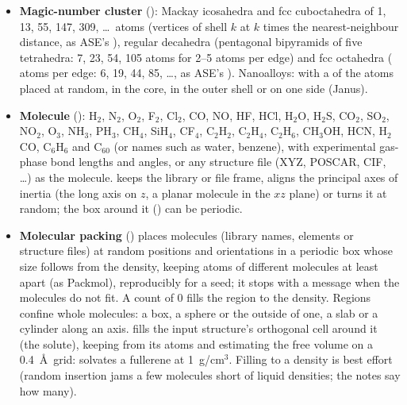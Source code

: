 \begin{itemize}
\item \textbf{Magic-number cluster} (): Mackay icosahedra and fcc cuboctahedra of 1, 13, 55, 147, 309, \ldots\ atoms (vertices of shell $k$ at $k$ times the nearest-neighbour distance, as ASE's ), regular decahedra (pentagonal bipyramids of five tetrahedra: 7, 23, 54, 105 atoms for 2--5 atoms per edge) and fcc octahedra ( atoms per edge: 6, 19, 44, 85, \ldots, as ASE's ). Nanoalloys:  with a  of the atoms placed at random, in the core, in the outer shell or on one side (Janus).
\item \textbf{Molecule} (): H$_2$, N$_2$, O$_2$, F$_2$, Cl$_2$, CO, NO, HF, HCl, H$_2$O, H$_2$S, CO$_2$, SO$_2$, NO$_2$, O$_3$, NH$_3$, PH$_3$, CH$_4$, SiH$_4$, CF$_4$, C$_2$H$_2$, C$_2$H$_4$, C$_2$H$_6$, CH$_3$OH, HCN, H$_2$CO, C$_6$H$_6$ and C$_{60}$ (or names such as water, benzene), with experimental gas-phase bond lengths and angles, or any structure file (XYZ, POSCAR, CIF, \ldots) as the molecule.  keeps the library or file frame, aligns the principal axes of inertia (the long axis on $z$, a planar molecule in the $xz$ plane) or turns it at random; the box around it () can be periodic.
\item \textbf{Molecular packing} () places molecules (library names, elements or structure files) at random positions and orientations in a periodic box whose size follows from the density, keeping atoms of different molecules at least  apart (as Packmol), reproducibly for a seed; it stops with a message when the molecules do not fit. A count of 0 fills the region to the density. Regions confine whole molecules: a box, a sphere or the outside of one, a slab or a cylinder along an axis.  fills the input structure's orthogonal cell around it (the solute), keeping  from its atoms and estimating the free volume on a 0.4~\AA\ grid:  solvates a fullerene at 1~g/cm$^3$. Filling to a density is best effort (random insertion jams a few molecules short of liquid densities; the notes say how many).
\end{itemize}
